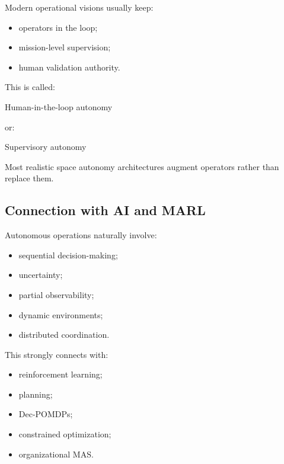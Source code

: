 \documentclass[10pt,a4paper,twocolumn]{article}
\begin{document}
Modern operational visions usually keep:
\begin{itemize}
    \item operators in the loop;
    \item mission-level supervision;
    \item human validation authority.
\end{itemize}

This is called:
\begin{center}
    Human-in-the-loop autonomy
\end{center}

or:
\begin{center}
    Supervisory autonomy
\end{center}

\begin{keybox}
    Most realistic space autonomy architectures augment operators rather than replace them.
\end{keybox}


\subsection{Connection with AI and MARL}

Autonomous operations naturally involve:
\begin{itemize}
    \item sequential decision-making;
    \item uncertainty;
    \item partial observability;
    \item dynamic environments;
    \item distributed coordination.
\end{itemize}

This strongly connects with:
\begin{itemize}
    \item reinforcement learning;
    \item planning;
    \item Dec-POMDPs;
    \item constrained optimization;
    \item organizational MAS.
\end{itemize}

\end{document}

